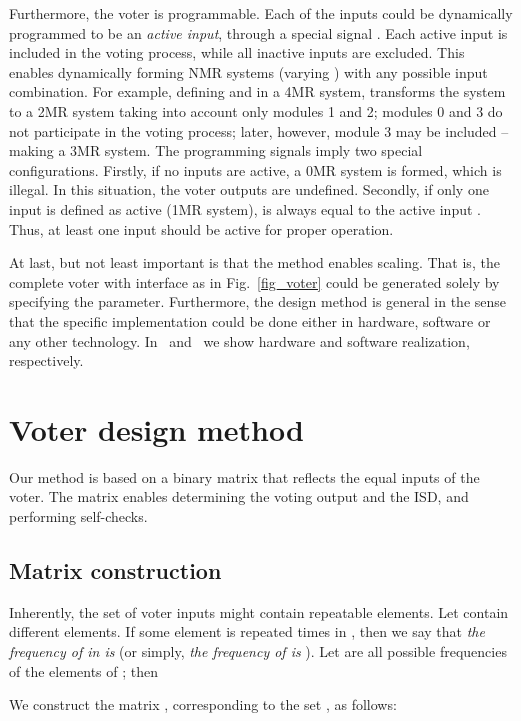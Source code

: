 \documentclass[technote, a4paper, onecolumn]{IEEEtran}  \newcommand{\avtor}{Aleksandar Simevski}
\begin{document}
Furthermore, the voter is programmable. Each of the  inputs could be dynamically programmed to be an \textit{active input}, through a special signal . Each active input is included in the voting process, while all inactive inputs are excluded. This enables dynamically forming NMR systems (varying ) with any possible input combination. For example, defining  and  in a 4MR system, transforms the system to a 2MR system taking into account only modules 1 and 2; modules 0 and 3 do not participate in the voting process; later, however, module 3 may be included -- making a 3MR system. The programming signals imply two special configurations. Firstly, if no inputs are active, a 0MR system is formed, which is illegal. In this situation, the voter outputs are undefined. Secondly, if only one input is defined as active (1MR system),  is always equal to the active input . Thus, at least one input should be active for proper operation.

At last, but not least important is that the method enables scaling. That is, the complete voter with interface as in Fig.~\ref{fig_voter} could be generated solely by specifying the  parameter. Furthermore, the design method is general in the sense that the specific implementation could be done either in hardware, software or any other technology. In~\cite{Simevski2012a} and~\cite{Simevski2013b} we show hardware and software realization, respectively.

\section{Voter design method}\label{sec_design}

Our method is based on a binary matrix that reflects the equal inputs of the voter. The matrix enables determining the voting output and the ISD, and performing self-checks. 

\subsection{Matrix construction}\label{subsec_matrix}

Inherently, the set of voter inputs  might contain repeatable elements. Let  contain  different elements. If some element  is repeated  times in , then we say that \textit{the frequency of  in  is } (or simply, \textit{the frequency of  is }). Let  are all possible frequencies of the elements of ; then 

We construct the matrix , corresponding to the set , as follows:
\end{document}
